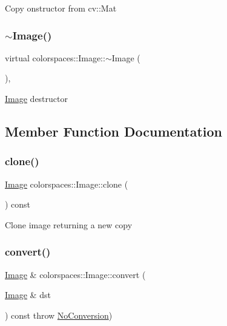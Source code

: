 Copy onstructor from cv\+::\+Mat \mbox{\label{classcolorspaces_1_1_image_ad5463e8cae11b572cd10a92734216f8a}} 
\subsubsection{\texorpdfstring{$\sim$\+Image()}{~Image()}}
{\footnotesize\ttfamily virtual colorspaces\+::\+Image\+::$\sim$\+Image (\begin{DoxyParamCaption}{ }\end{DoxyParamCaption})\hspace{0.3cm}{\ttfamily [inline]}, {\ttfamily [virtual]}}

\hyperlink{classcolorspaces_1_1_image}{Image} destructor 

\subsection{Member Function Documentation}
\mbox{\label{classcolorspaces_1_1_image_a1bf62f4371700005a8f9581b2f70f31f}} 
\subsubsection{\texorpdfstring{clone()}{clone()}}
{\footnotesize\ttfamily \hyperlink{classcolorspaces_1_1_image}{Image} colorspaces\+::\+Image\+::clone (\begin{DoxyParamCaption}{ }\end{DoxyParamCaption}) const}

Clone image returning a new copy \mbox{\label{classcolorspaces_1_1_image_af33b3aeb1a668b64f3ae4e00b90058a5}} 
\subsubsection{\texorpdfstring{convert()}{convert()}}
{\footnotesize\ttfamily \hyperlink{classcolorspaces_1_1_image}{Image} \& colorspaces\+::\+Image\+::convert (\begin{DoxyParamCaption}\item[{\hyperlink{classcolorspaces_1_1_image}{Image} \&}]{dst }\end{DoxyParamCaption}) const throw  \hyperlink{classcolorspaces_1_1_image_1_1_no_conversion}{No\+Conversion}) }

